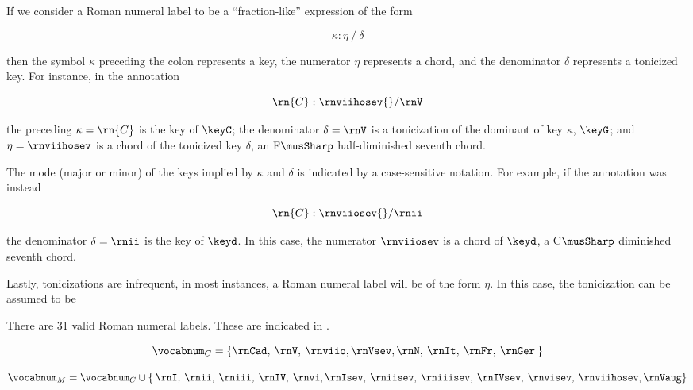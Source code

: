 
If we consider a Roman numeral label to be a
``fraction-like'' expression of the form

\begin{equation}
    \kappa : \eta \: / \: \delta
\end{equation}

then the symbol $\kappa$ preceding the colon represents a
key, the numerator $\eta$ represents a chord, and the
denominator $\delta$ represents a tonicized key. For
instance, in the annotation 

\begin{equation}
    \rn{C}:\rnviihosev{}/\rnV
\end{equation}

the preceding $\kappa=\rn{C}$ is the key of $\keyC$; the
denominator $\delta = \rnV$ is a tonicization of the
dominant of key $\kappa$, $\keyG$; and $\eta=\rnviihosev$ is
a chord of the tonicized key $\delta$, an F$\musSharp$
half-diminished seventh chord.

The mode (major or minor) of the keys implied by $\kappa$
and $\delta$ is indicated by a case-sensitive notation. For
example, if the annotation was instead

\begin{equation}
    \rn{C}:\rnviiosev{}/\rnii
\end{equation}

the denominator $\delta=\rnii$ is the key of $\keyd$. In
this case, the numerator $\rnviiosev$ is a chord of $\keyd$,
a C$\musSharp$ diminished seventh chord.

Lastly, tonicizations are infrequent, in most instances, a
Roman numeral label will be of the form $\eta$. In this
case, the tonicization can be assumed to be 

There are 31 valid Roman numeral labels. These are indicated
in .



\begin{equation}
    \vocabnum_{C} = \{ \rnCad, \: \rnV, \: \rnviio,
    \rnVsev, \rnN, \: \rnIt, \: \rnFr, \: \rnGer \: \}
\end{equation}

\begin{equation}
    \vocabnum_{M} = \vocabnum_{C} \cup \{ \: \rnI, \: \rnii, \: 
    \rniii, \: \rnIV, \: \rnvi, \rnIsev, \: \rniisev, \: 
    \rniiisev, \: \rnIVsev, \: \rnvisev, \: \rnviihosev, \rnVaug \}
\end{equation}


